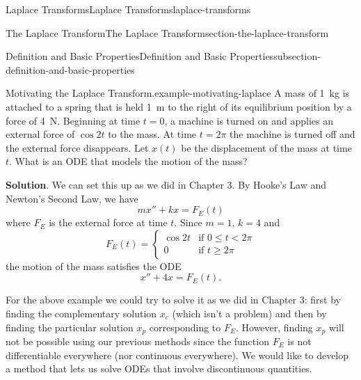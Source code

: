 \documentclass[oneside,10pt,]{book}
\numberwithin{equation}{section}
\newcommand{\lt}{<}
\newcommand{\amp}{&}
\begin{document}
\begin{chapterptx}{Laplace Transforms}{}{Laplace Transforms}{}{}{laplace-transforms}
%
%
\typeout{************************************************}
\typeout{************************************************}
%
\begin{sectionptx}{The Laplace Transform}{}{The Laplace Transform}{}{}{section-the-laplace-transform}
%
%
\typeout{************************************************}
\typeout{************************************************}
%
\begin{subsectionptx}{Definition and Basic Properties}{}{Definition and Basic Properties}{}{}{subsection-definition-and-basic-properties}
\begin{example}{Motivating the Laplace Transform.}{example-motivating-laplace}%
\hypertarget{p-486}{}%
A mass of \SI{1}{\kilogram} is attached to a spring that is held \SI{1}{\meter} to the right of its equilibrium position by a force of \SI{4}{\newton}. Beginning at time \(t=0\), a machine is turned on and applies an external force of \(\cos2t\) to the mass. At time \(t=2\pi\) the machine is turned off and the external force disappears. Let \(x(t)\) be the displacement of the mass at time \(t\). What is an ODE that models the motion of the mass?%
\par\smallskip%
\noindent\textbf{Solution}.\hypertarget{solution-76}{}\quad%
\hypertarget{p-487}{}%
We can set this up as we did in Chapter 3. By Hooke's Law and Newton's Second Law, we have%
\begin{equation*}
mx''+kx = F_{E}(t)
\end{equation*}
where \(F_{E}\) is the external force at time \(t\). Since \(m = 1\), \(k = 4\) and%
\begin{equation*}
F_{E}(t) = 
\begin{cases}
\cos2t \amp \text{if }0\leq t\lt 2\pi\\
0 \amp\text{if } t\geq2\pi  
\end{cases}
\end{equation*}
the motion of the mass satisfies the ODE%
\begin{equation*}
x''+4x = F_{E}(t).
\end{equation*}
%
\end{example}
\hypertarget{p-488}{}%
For the above example we could try to solve it as we did in Chapter 3: first by finding the complementary solution \(x_{c}\) (which isn't a problem) and then by finding the particular solution \(x_{p}\) corresponding to \(F_{E}\). However, finding \(x_{p}\) will not be possible using our previous methods since the function \(F_{E}\) is not differentiable everywhere (nor continuous everywhere). We would like to develop a method that lets us solve ODEs that involve discontinuous quantities.%

\end{subsectionptx}
\end{sectionptx}
\end{chapterptx}
\end{document}
